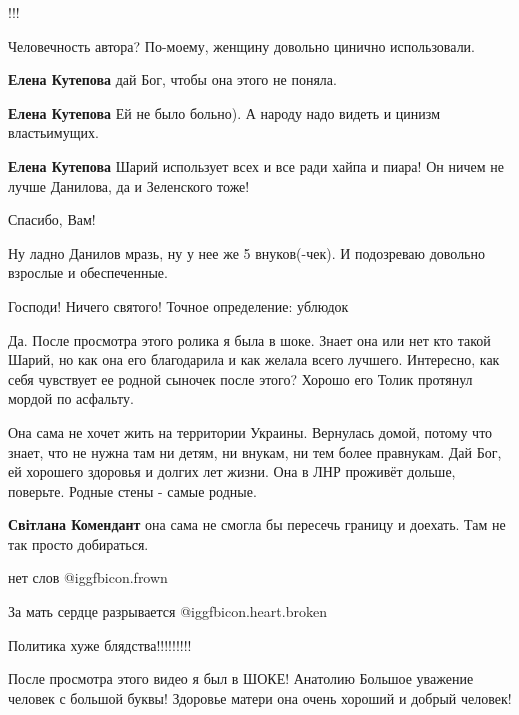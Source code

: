\begin{itemize}
!!!

Человечность автора? По-моему, женщину довольно цинично использовали.

\begin{itemize} %
\textbf{Елена Кутепова} дай Бог, чтобы она этого не поняла.

\textbf{Елена Кутепова} Ей не было больно). А народу надо видеть и цинизм властьимущих.

\textbf{Елена Кутепова} Шарий использует всех и все ради хайпа и пиара! Он ничем не лучше Данилова, да и Зеленского тоже!
\end{itemize} %


Спасибо, Вам!


Ну ладно Данилов мразь, ну у нее же 5 внуков(-чек). И подозреваю довольно
взрослые и обеспеченные.


Господи! Ничего святого! Точное определение: ублюдок


Да. После просмотра этого ролика я была в шоке. Знает она или нет кто такой
Шарий, но как она его благодарила и как желала всего лучшего. Интересно, как
себя чувствует ее родной сыночек после этого? Хорошо его Толик протянул мордой
по асфальту.


Она сама не хочет жить на территории Украины. Вернулась домой, потому что
знает, что не нужна там ни детям, ни внукам, ни тем более правнукам. Дай Бог,
ей хорошего здоровья и долгих лет жизни. Она в ЛНР проживёт дольше, поверьте.
Родные стены - самые родные.

\begin{itemize} %
\textbf{Світлана Комендант} она сама не смогла бы пересечь границу и доехать. Там не так просто добираться.
\end{itemize} %

нет слов  @igg{fbicon.frown} 

За мать сердце разрывается  @igg{fbicon.heart.broken} 

Политика хуже блядства!!!!!!!!!

После просмотра этого видео я был в ШОКЕ!
Анатолию Большое уважение человек с большой буквы!
Здоровье матери она очень хороший и добрый человек!


\end{itemize}
